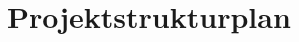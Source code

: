 %
%
%
%


\section{Projektstrukturplan}
\label{app:psp}

\clearpage
\setlength\paperheight{297mm}
\setlength\paperwidth{420mm}
\setlength\pdfpageheight{\paperheight}
\setlength\pdfpagewidth{\paperwidth}



\setlength\paperheight{297mm}
\setlength\paperwidth{210mm}
\setlength\pdfpageheight{\paperheight}
\setlength\pdfpagewidth{\paperwidth}
